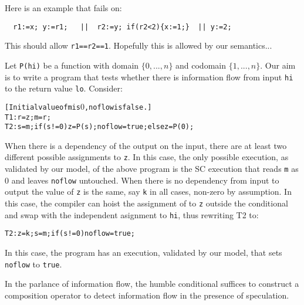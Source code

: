 Here is an example that \cite{DBLP:conf/lics/JeffreyR16} fails on:
\begin{verbatim}
  r1:=x; y:=r1;   ||  r2:=y; if(r2<2){x:=1;}  || y:=2;
\end{verbatim}
This should allow \texttt{r1==r2==1}.  Hopefully this is allowed by our
semantics...


Let {\tt P(hi)} be a function with domain $\{0, . . . ,n \}$  and codomain $\{1, . . . ,n \}$. Our aim is to write a
program that tests whether there is information flow from input {\tt  hi} to the return value {\tt lo}. Consider:
\begin{alltt}
  
[Initial value of m is $0$ , {\tt noflow} is {\tt false}. ]
T1: r = z; m =r;
T2: s=m; if (s!=0) { z=P(s); noflow=true; } else { z=P(0); }
% T2:  s = m;
%      switch(s):
%          case 0: z = P(0);
%          case 1: z = P(1); noflow = {\tt true};
%           ...
%          case n: z = P(n); noflow = {\tt true};
\end{alltt}
When there is a dependency of the output on the input, there are at least two different possible
assignments to {\tt z}. In this case, the only possible execution, as validated by our model, of the above
program is the SC execution that reads {\tt m} as $0$ and leaves {\tt noflow} untouched.
When there is no dependency from input to output the value of {\tt z} is the same, say {\tt k} in all cases,
non-zero by assumption. In this case, the compiler can hoist the assignment of  to  {\tt z} outside the
conditional and swap with the independent asignment to {\tt hi}, 
thus rewriting T2 to:
\begin{alltt}
T2: z=k; s=m; if (s!=0) { noflow=true; }
% T2:  z = k;
%      s= m;
%      switch(s):
%      case 0: z = P(0);
%      case 1: noflow = {\tt true};
%      ...
%      case n: noflow = {\tt true};
\end{alltt}
In this case, the program has an execution, validated by our model, that sets {\tt noflow} to {\tt true}.

In the parlance
of information flow, the humble conditional suffices to construct a composition operator to detect information flow  in the presence of speculation.
